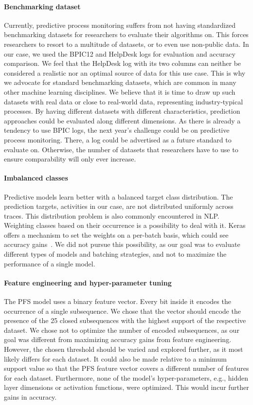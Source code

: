 \paragraph{Benchmarking dataset} Currently, predictive process monitoring suffers from not having standardized benchmarking datasets for researchers to evaluate their algorithms on.
This forces researchers to resort to a multitude of datasets, or to even use non-public data.
In our case, we used the BPIC12 and HelpDesk logs for evaluation and accuracy comparison.
We feel that the HelpDesk log with its two columns can neither be considered a realistic nor an optimal source of data for this use case.
This is why we advocate for standard benchmarking datasets, which are common in many other machine learning disciplines.
We believe that it is time to draw up such datasets with real data or close to real-world data, representing industry-typical processes.
By having different datasets with different characteristics, prediction approaches could be evaluated along different dimensions.
As there is already a tendency to use BPIC logs, the next year's challenge could be on predictive process monitoring.
There, a log could be advertised as a future standard to evaluate on.
Otherwise, the number of datasets that researchers have to use to ensure comparability will only ever increase.

\paragraph{Imbalanced classes} Predictive models learn better with a balanced target class distribution.
The prediction targets, activities in our case, are not distributed uniformly across traces.
This distribution problem is also commonly encountered in NLP.
Weighting classes based on their occurrence is a possibility to deal with it.
Keras offers a mechanism to set the weights on a per-batch basis, which could see accuracy gains~\cite{web:stackoverflow-keras-class-weights}.
We did not pursue this possibility, as our goal was to evaluate different types of models and batching strategies, and not to maximize the performance of a single model.

\paragraph{Feature engineering and hyper-parameter tuning} The PFS model uses a binary feature vector.
Every bit inside it encodes the occurrence of a single subsequence.
We chose that the vector should encode the presence of the 25 closed subsequences with the highest support of the respective dataset.
We chose not to optimize the number of encoded subsequences, as our goal was different from maximizing accuracy gains from feature engineering.
However, the chosen threshold should be varied and explored further, as it most likely differs for each dataset.
It could also be made relative to a minimum support value so that the PFS feature vector covers a different number of features for each dataset.
Furthermore, none of the model's hyper-parameters, e.g., hidden layer dimensions or activation functions, were optimized.
This would incur further gains in accuracy.

